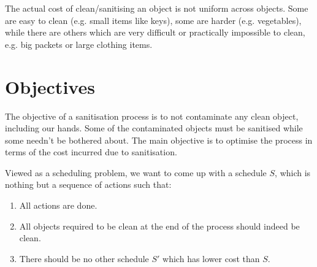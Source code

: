\documentclass[12pts]{article}
\begin{document}
The actual cost of clean/sanitising an object is not uniform across objects. Some are easy to clean (e.g. small items like keys), some are harder (e.g. vegetables), while there are others which are very difficult or practically impossible to clean, e.g. big packets or large clothing items.

\section{Objectives}
The objective of a sanitisation process is to not contaminate any clean object, including our hands. Some of the contaminated objects must be sanitised while some needn't be bothered about. The main objective is to optimise the process in terms of the cost incurred due to sanitisation.

Viewed as a scheduling problem, we want to come up with a schedule $S$, which is nothing but a sequence of actions such that:
\begin{enumerate}
\item All actions are done.
\item All objects required to be clean at the end of the process should indeed be clean.
\item There should be no other schedule $S'$ which has lower cost than $S$.
\end{enumerate}
\end{document}
